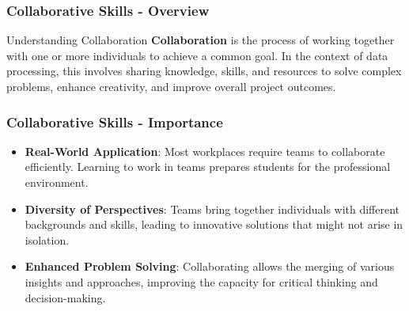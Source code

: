 \documentclass[aspectratio=169]{beamer}
\begin{document}
\begin{frame}[fragile]
    \frametitle{Collaborative Skills - Overview}
    \begin{block}{Understanding Collaboration}
        \textbf{Collaboration} is the process of working together with one or more individuals to achieve a common goal. 
        In the context of data processing, this involves sharing knowledge, skills, and resources to solve complex problems, enhance creativity, and improve overall project outcomes.
    \end{block}
\end{frame}

\begin{frame}[fragile]
    \frametitle{Collaborative Skills - Importance}
    \begin{itemize}
        \item \textbf{Real-World Application}: Most workplaces require teams to collaborate efficiently. 
        Learning to work in teams prepares students for the professional environment.
        \item \textbf{Diversity of Perspectives}: Teams bring together individuals with different backgrounds and skills, 
        leading to innovative solutions that might not arise in isolation.
        \item \textbf{Enhanced Problem Solving}: Collaborating allows the merging of various insights and approaches, 
        improving the capacity for critical thinking and decision-making.
    \end{itemize}
\end{frame}
\end{document}
